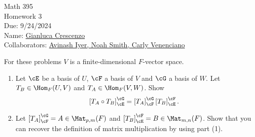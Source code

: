 \documentclass[10pt,twoside,openany]{memoir}
\begin{document}
\begin{center}
    { \Large Math 395 \\[0.1in]Homework 3 \\[0.1in]
    Due: 9/24/2024}\\[.25in]
    { Name:} {\underline{Gianluca Crescenzo\hspace*{2in}}}\\[0.15in]
    { Collaborators:} {\underline{ Avinash Iyer, Noah Smith, Carly Venenciano \hspace*{2in}}} \\
    \end{center}
    \vspace{3pt}
    For these problems $V$ is a finite-dimensional $F$-vector space.
    \vspace{3pt}
\begin{exercise*}
    \phantom{a}
    \begin{enumerate}[label = (\arabic*)]
        \item Let $\cE$ be a basis of $U$, $\cF$ a basis of $V$ and $\cG$ a basis of $W$. Let $T_B \in \Hom_F{(U,V)}$ and $T_A \in \Hom_F{(V,W)}$. Show
            \begin{equation*}
            \begin{split}
                \left[ T_A \circ T_B \right]_\cE ^ \cG = \left[ T_A \right]_\cF ^\cG \left[ T_B \right]_\cE ^ \cF.
            \end{split}
            \end{equation*}
        \item Let $\left[ T_A \right]_\cF ^\cG = A \in \Mat_{p,m}(F)$ and $\left[ T_B \right]_\cE ^ \cF = B \in \Mat_{m,n}(F)$. Show that you can recover the definition of matrix multiplication by using part (1).
    \end{enumerate}
\end{exercise*}
\end{document}
